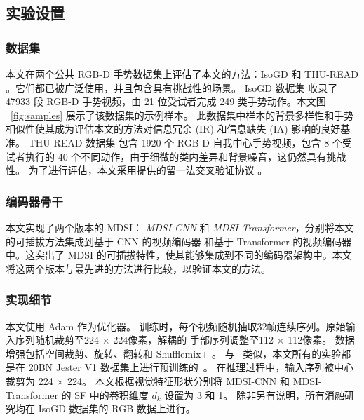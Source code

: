 \subsection{实验设置}
\subsubsection{数据集}
本文在两个公共 RGB-D 手势数据集上评估了本文的方法：IsoGD \cite{wan2016chalearn} 和 THU-READ \cite{tang2017action}。它们都已被广泛使用，并且包含具有挑战性的场景。
IsoGD 数据集 \cite{wan2016chalearn} 收录了 47933 段 RGB-D 手势视频，由 21 位受试者完成 249 类手势动作。本文图 ~\ref{fig:samples} 展示了该数据集的示例样本。
此数据集中样本的背景多样性和手势相似性使其成为评估本文的方法对信息冗余 (IR) 和信息缺失 (IA) 影响的良好基准。
THU-READ 数据集 \cite{tang2017action} 包含 1920 个 RGB-D 自我中心手势视频，包含 8 个受试者执行的 40 个不同动作，由于细微的类内差异和背景噪音，这仍然具有挑战性。
为了进行评估，本文采用提供的留一法交叉验证协议 \cite{li2021trear}。




\subsubsection{编码器骨干}
\label{sec:encoder_backbone}
本文实现了两个版本的 MDSI： \emph{MDSI-CNN} 和 \emph{MDSI-Transformer}，分别将本文的可插拔方法集成到基于 CNN 的视频编码器 \cite{zhu2018continuous} 和基于 Transformer 的视频编码器 \cite{zhou2022decoupling} 中。这突出了 MDSI 的可插拔特性，使其能够集成到不同的编码器架构中。本文将这两个版本与最先进的方法进行比较，以验证本文的方法。

\subsubsection{实现细节}
\label{sec:implementation}
本文使用 Adam 作为优化器。
训练时，每个视频随机抽取32帧连续序列。原始输入序列随机裁剪至224 $\times$ 224像素，解耦的
手部序列调整至112 $\times$ 112像素。
数据增强包括空间裁剪、旋转、翻转和 Shufflemix+ \cite{zhou2023unified}。
与~\cite{yu2021searching,zhou2021regional,zhou2022decoupling,zhou2023unified} 类似，本文所有的实验都是在 20BN Jester V1 数据集上进行预训练的~\cite{materzynska2019jester}。
在推理过程中，输入序列被中心裁剪为 224 × 224。
本文根据视觉特征形状分别将 MDSI-CNN 和 MDSI-Transformer 的 SF 中的卷积维度 $d_k$ 设置为 3 和 1。
除非另有说明，所有消融研究均在 IsoGD 数据集的 RGB 数据上进行。

